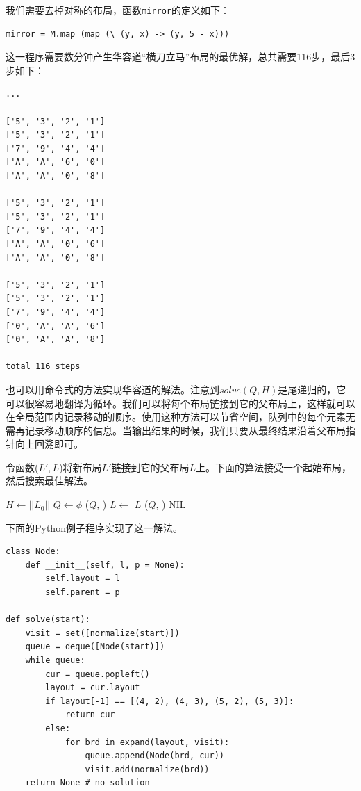 \documentclass[UTF8]{article}
\begin{document}
我们需要去掉对称的布局，函数\texttt{mirror}的定义如下：

\lstset{language=Haskell}
\begin{lstlisting}
mirror = M.map (map (\ (y, x) -> (y, 5 - x)))
\end{lstlisting}

这一程序需要数分钟产生华容道“横刀立马”布局的最优解，总共需要116步，最后3步如下：

\begin{verbatim}
...

['5', '3', '2', '1']
['5', '3', '2', '1']
['7', '9', '4', '4']
['A', 'A', '6', '0']
['A', 'A', '0', '8']

['5', '3', '2', '1']
['5', '3', '2', '1']
['7', '9', '4', '4']
['A', 'A', '0', '6']
['A', 'A', '0', '8']

['5', '3', '2', '1']
['5', '3', '2', '1']
['7', '9', '4', '4']
['0', 'A', 'A', '6']
['0', 'A', 'A', '8']

total 116 steps
\end{verbatim}

也可以用命令式的方法实现华容道的解法。注意到$solve(Q, H)$是尾递归的，它可以很容易地翻译为循环。我们可以将每个布局链接到它的父布局上，这样就可以在全局范围内记录移动的顺序。使用这种方法可以节省空间，队列中的每个元素无需再记录移动顺序的信息。当输出结果的时候，我们只要从最终结果沿着父布局指针向上回溯即可。

令函数($L', L$)将新布局$L'$链接到它的父布局$L$上。下面的算法接受一个起始布局，然后搜索最佳解法。

\begin{algorithmic}[1]
  \State $H \gets ||L_0||$
  \State $Q \gets \phi$
  \State {}($Q$, )
    \State $L \gets $ 
      \State \Return $L$
    \Else
        \State {}($Q$, )
        \State {}
      \EndFor
    \EndIf
  \EndWhile
  \State \Return NIL 
\EndFunction
\end{algorithmic}

下面的Python例子程序实现了这一解法。

\lstset{language=Python}
\begin{lstlisting}
class Node:
    def __init__(self, l, p = None):
        self.layout = l
        self.parent = p

def solve(start):
    visit = set([normalize(start)])
    queue = deque([Node(start)])
    while queue:
        cur = queue.popleft()
        layout = cur.layout
        if layout[-1] == [(4, 2), (4, 3), (5, 2), (5, 3)]:
            return cur
        else:
            for brd in expand(layout, visit):
                queue.append(Node(brd, cur))
                visit.add(normalize(brd))
    return None # no solution
\end{lstlisting}
\end{document}
